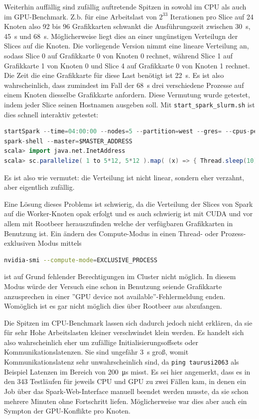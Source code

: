 Weiterhin auffällig sind zufällig auftretende Spitzen in sowohl im CPU als auch im GPU-Benchmark. Z.b. für eine Arbeitslast von $2^33$ Iterationen pro Slice auf 24 Knoten also 92 bis 96 Grafikkarten schwankt die Ausführungszeit zwischen \SI{30}{\second}, \SI{45}{\second} und \SI{68}{\second}. Möglicherweise liegt dies an einer ungünstigen Verteilugn der Slices auf die Knoten. Die vorliegende Version nimmt eine lineare Verteilung an, sodass Slice 0 auf Grafikkarte 0 von Knoten 0 rechnet, während Slice 1 auf Grafikkarte 1 von Knoten 0 und Slice 4 auf Grafikkarte 0 von Knoten 1 rechnet. Die Zeit die eine Grafikkarte für diese Last benötigt ist \SI{22}{\second}. Es ist also wahrscheinlich, dass zumindest im Fall der \SI{68}{\second} drei verschiedene Prozesse auf einem Knoten diesselbe Grafikkarte anfordern. Diese Vermutung wurde getestet, indem jeder Slice seinen Hostnamen ausgeben soll. Mit \lstinline!start_spark_slurm.sh! \cite{scaromare} ist dies schnell interaktiv getestet:
\begin{lstlisting}[language=scala]
startSpark --time=04:00:00 --nodes=5 --partition=west --gres= --cpus-per-task=12
spark-shell --master=$MASTER_ADDRESS
scala> import java.net.InetAddress
scala> sc.parallelize( 1 to 5*12, 5*12 ).map( (x) => { Thread.sleep(10); x+" : "+InetAddress.getLocalHost().getHostName() } ).collect().foreach( println )
\end{lstlisting}\vspace{-1.5\baselineskip}
Es ist also wie vermutet: die Verteilung ist nicht linear, sondern eher verzahnt, aber eigentlich zufällig.

Eine Lösung dieses Problems ist schwierig, da die Verteilung der Slices von Spark auf die Worker-Knoten opak erfolgt und es auch schwierig ist mit CUDA und vor allem mit Rootbeer herauszufinden welche der verfügbaren Grafikkarten in Benutzung ist. Ein ändern des Compute-Modus in einen Thread- oder Prozess-exklusiven Modus mittels
\begin{lstlisting}[language=bash]
nvidia-smi --compute-mode=EXCLUSIVE_PROCESS
\end{lstlisting}
ist auf Grund fehlender Berechtigungen im Cluster nicht möglich. In diesem Modus würde der Versuch eine schon in Benutzung seiende Grafikkarte anzusprechen in einer ''GPU device not available''-Fehlermeldung enden. Womöglich ist es gar nicht möglich dies über Rootbeer aus abzufangen.

Die Spitzen im CPU-Benchmark lassen sich dadurch jedoch nicht erklären, da sie für sehr Hohe Arbeitslasten kleiner verschwindet klein werden. Es handelt sich also wahrscheinlich eher um zufällige Initialisierungsoffsets oder Kommunikationslatenzen. Sie sind ungefähr \SI{3}{\second} groß, womit Kommunikationslatenz sehr unwahrscheinlich sind, da \lstinline!ping taurusi2063! als Beispiel Latenzen im Bereich von \SI{200}{\micro\second} misst. Es sei hier angemerkt, dass es in den 343 Testläufen für jeweils CPU und GPU zu zwei Fällen kam, in denen ein Job über das Spark-Web-Interface manuell beendet werden musste, da sie schon mehrere Minuten ohne Fortschritt liefen. Möglicherweise war dies aber auch ein Sympton der GPU-Konflikte pro Knoten.

